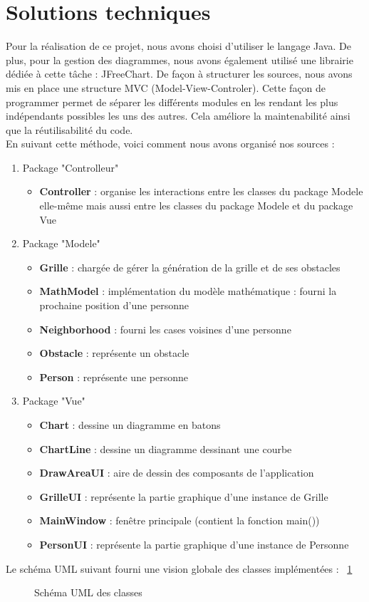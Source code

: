 \section{Solutions techniques}
	Pour la réalisation de ce projet, nous avons choisi d'utiliser le langage Java. De plus, pour la gestion des diagrammes, nous avons également utilisé une librairie dédiée à cette tâche : JFreeChart. De façon à structurer les sources, nous avons mis en place une structure MVC (Model-View-Controler). Cette façon de programmer permet de séparer les différents modules en les rendant les plus indépendants possibles les uns des autres. Cela améliore la maintenabilité ainsi que la réutilisabilité du code.\\
	En suivant cette méthode, voici comment nous avons organisé nos sources :
	
	\begin{enumerate}
		\item Package "Controlleur"
		\begin{itemize}
			\item \textbf{Controller} : organise les interactions entre les classes du package Modele elle-même mais aussi entre les classes du package Modele et du package Vue
		\end{itemize}
		
		\item Package "Modele"
		\begin{itemize}
			\item \textbf{Grille} : chargée de gérer la génération de la grille et de ses obstacles
			\item \textbf{MathModel} : implémentation du modèle mathématique : fourni la prochaine position d'une personne
			\item \textbf{Neighborhood} : fourni les cases voisines d'une personne
			\item \textbf{Obstacle} : représente un obstacle
			\item \textbf{Person} : représente une personne
		\end{itemize}
		
		\item Package "Vue"
		\begin{itemize}
			\item \textbf{Chart} : dessine un diagramme en batons
			\item \textbf{ChartLine} : dessine un diagramme dessinant une courbe
			\item \textbf{DrawAreaUI} : aire de dessin des composants de l'application
			\item \textbf{GrilleUI} : représente la partie graphique d'une instance de Grille 
			\item \textbf{MainWindow} : fenêtre principale (contient la fonction main())
			\item \textbf{PersonUI} : représente la partie graphique d'une instance de Personne
		\end{itemize}
	\end{enumerate}	
	
	Le schéma UML suivant fourni une vision globale des classes implémentées : ~\ref{fig:uml}\\
	
%	
	
	\begin{figure}[!H]
	\centering
	
	\caption{Schéma UML des classes}
	\label{fig:uml}
	\end{figure}
	
	